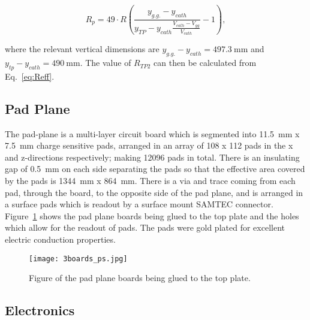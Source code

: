 \begin{equation}
R_p = 49 \cdot R  \left(\frac{ y_{g.g.} - y_{cath} }{ y_{TP} - y_{cath} \frac{V_{cath} - V_{gg}}{V_{cath}} }- 1 \right),
\label{eq:TP_resistor}
\end{equation}

where the relevant vertical dimensions are $y_{g.g.} - y_{cath} = \SI{497.3}{\milli\metre}$ and $y_{tp} - y_{cath} = \SI{490}{\milli\metre}$. The value of $R_{TP2}$ can then be calculated from Eq.~\ref{eq:Reff}.


\subsection{Pad Plane}
The pad-plane is a multi-layer circuit board which is segmented into \SI{11.5}{\milli\metre} x \SI{7.5}{\milli\metre} charge sensitive pads, arranged in an array of 108 x 112 pads in the x and z-directions respectively; making 12096 pads in total. There is an insulating gap of \SI{0.5}{\milli\metre} on each side separating the pads so that the effective area covered by the pads is \SI{1344}{\milli\metre} x \SI{864}{\milli\metre}. There is a via and trace coming from each pad, through the board, to the opposite side of the pad plane, and is arranged in a surface pads which is readout by a surface mount SAMTEC connector. Figure~\ref{fig:padplane} shows the pad plane boards being glued to the top plate and the holes which allow for the readout of pads. The pads were gold plated for excellent electric conduction properties. 

\begin{figure}[!htb]
\centering
\texttt{[image: 3boards\_ps.jpg]}
\caption{Figure of the pad plane boards being glued to the top plate. }
\label{fig:padplane}
\end{figure}


\subsection{Electronics}

